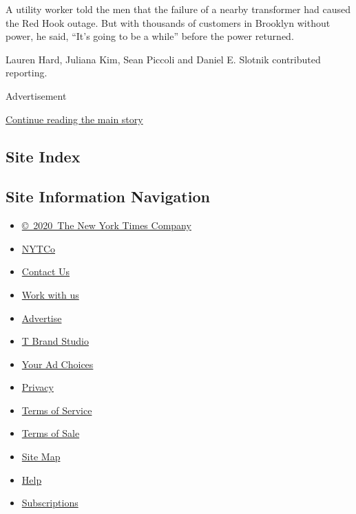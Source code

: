 A utility worker told the men that the failure of a nearby transformer
had caused the Red Hook outage. But with thousands of customers in
Brooklyn without power, he said, ``It's going to be a while'' before the
power returned.

Lauren Hard, Juliana Kim, Sean Piccoli and Daniel E. Slotnik contributed
reporting.

Advertisement

\protect\hyperlink{after-bottom}{Continue reading the main story}

\hypertarget{site-index}{%
\subsection{Site Index}\label{site-index}}

\hypertarget{site-information-navigation}{%
\subsection{Site Information
Navigation}\label{site-information-navigation}}

\begin{itemize}
\tightlist
\item
  \href{https://help.nytimes3xbfgragh.onion/hc/en-us/articles/115014792127-Copyright-notice}{©~2020~The
  New York Times Company}
\end{itemize}

\begin{itemize}
\tightlist
\item
  \href{https://www.nytco.com/}{NYTCo}
\item
  \href{https://help.nytimes3xbfgragh.onion/hc/en-us/articles/115015385887-Contact-Us}{Contact
  Us}
\item
  \href{https://www.nytco.com/careers/}{Work with us}
\item
  \href{https://nytmediakit.com/}{Advertise}
\item
  \href{http://www.tbrandstudio.com/}{T Brand Studio}
\item
  \href{https://www.nytimes3xbfgragh.onion/privacy/cookie-policy\#how-do-i-manage-trackers}{Your
  Ad Choices}
\item
  \href{https://www.nytimes3xbfgragh.onion/privacy}{Privacy}
\item
  \href{https://help.nytimes3xbfgragh.onion/hc/en-us/articles/115014893428-Terms-of-service}{Terms
  of Service}
\item
  \href{https://help.nytimes3xbfgragh.onion/hc/en-us/articles/115014893968-Terms-of-sale}{Terms
  of Sale}
\item
  \href{https://spiderbites.nytimes3xbfgragh.onion}{Site Map}
\item
  \href{https://help.nytimes3xbfgragh.onion/hc/en-us}{Help}
\item
  \href{https://www.nytimes3xbfgragh.onion/subscription?campaignId=37WXW}{Subscriptions}
\end{itemize}
